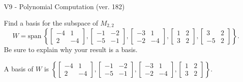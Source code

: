 \begin{exercise}
  \begin{exerciseTitle}V9 - Polynomial Computation (ver. 182)\end{exerciseTitle}
  \begin{exerciseStatement}
    Find a basis for the subspace of \(M_{2,2}\) 
\[W=\mathrm{span}\ \left\{\left[\begin{array}{cc}
-4 & 1 \\
2 & -4
\end{array}\right] , \left[\begin{array}{cc}
-1 & -2 \\
-5 & -1
\end{array}\right] , \left[\begin{array}{cc}
-3 & 1 \\
-2 & -4
\end{array}\right] , \left[\begin{array}{cc}
1 & 2 \\
3 & 2
\end{array}\right] , \left[\begin{array}{cc}
3 & 2 \\
-5 & 2
\end{array}\right]\right\}.\]
 Be sure to explain why your result is a basis.


  \end{exerciseStatement}
  \begin{exerciseAnswer}
   A basis of \(W\) is  \(\left\{\left[\begin{array}{cc}
-4 & 1 \\
2 & -4
\end{array}\right] , \left[\begin{array}{cc}
-1 & -2 \\
-5 & -1
\end{array}\right] , \left[\begin{array}{cc}
-3 & 1 \\
-2 & -4
\end{array}\right] , \left[\begin{array}{cc}
1 & 2 \\
3 & 2
\end{array}\right]\right\}\).
  


  \end{exerciseAnswer}
\end{exercise}